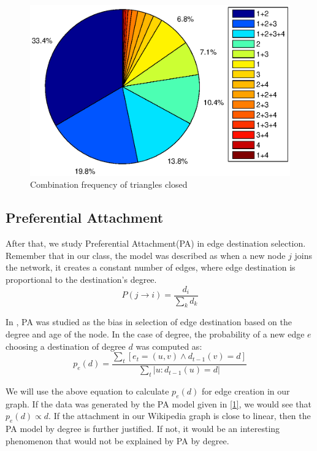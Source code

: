 \documentclass[10pt]{article}
\begin{document}
\begin{multicols}{2}
\begin{figure}[H]
    \includegraphics[scale=0.45, trim = 6cm 1cm 0cm 0cm]{./15_tri.eps}
    \caption{Combination frequency of triangles closed} \label{fig:combo15}
\end{figure}


\subsection{Preferential Attachment}
After that, we study Preferential Attachment(PA) in edge destination selection. Remember that in our class, the model was described as when a new node $j$ joins the network, it creates a constant number of edges, where edge destination is proportional to the destination's degree.
\begin{equation}
\label{1}
P(j\rightarrow i)=\frac{d_i}{\sum\limits_{k}d_k}
\end{equation}

In \cite{leskovec2008microscopic}, PA was studied as the bias in selection of edge destination based on the degree and age of the node. In the case of degree, the probability of a new edge $e$ choosing a destination of degree $d$ was computed as:
\begin{equation}
\label{2}
p_e(d)=\frac{\sum\limits_{t}[e_t=(u,v)\wedge d_{t-1}(v)=d]}{\sum\limits_{t}|u:d_{t-1}(u)=d|}
\end{equation}

We will use the above equation to calculate $p_e(d)$ for edge creation in our graph. If the data was generated by the PA model given in \eqref{1}, we would see that $p_e(d)\propto d$. If the attachment in our Wikipedia graph is close to linear, then the PA model by degree is further justified. If not, it would be an interesting phenomenon that would not be explained by PA by degree.


\end{multicols}
\end{document}
